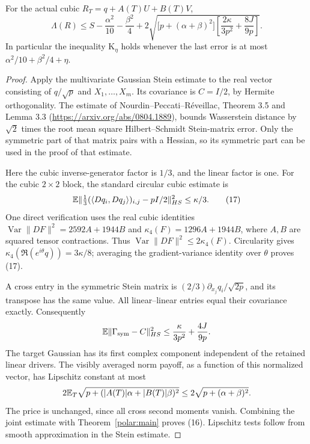 \begin{theorem}\label{polar:joint}
For the actual cubic $R_T=q+A(T)U+B(T)V$,
\[
 \Lambda(R)\le S-\frac{\alpha^2}{10}-\frac{\beta^2}{4}
 +2\sqrt{\bigl[p+(\alpha+\beta)^2\bigr]
             \left[\frac{2\kappa}{3p^2}+\frac{8J}{9p}\right]}.
                                                               \tag{16}
\]
In particular the inequality K$_\eta$ holds whenever the last error
is at most $\alpha^2/10+\beta^2/4+\eta$.
\end{theorem}
\begin{proof}
Apply the multivariate Gaussian Stein estimate to the real vector
consisting of $q/\sqrt p$ and $X_1,\ldots,X_m$. Its covariance is
$C=I/2$, by Hermite orthogonality. The estimate of
Nourdin--Peccati--R\'eveillac, Theorem 3.5 and Lemma 3.3
(\url{https://arxiv.org/abs/0804.1889}), bounds Wasserstein distance
by $\sqrt2$ times the root mean square Hilbert--Schmidt Stein-matrix
error. Only the symmetric part of that matrix pairs with a Hessian,
so its symmetric part can be used in the proof of that estimate.

Here the cubic inverse-generator factor is $1/3$, and the linear
factor is one. For the cubic $2\times2$ block, the standard circular
cubic estimate is
\[
 \mathbb E\|\tfrac13(\langle Dq_i,Dq_j\rangle)_{i,j}-pI/2\|_{HS}^2
 \le\kappa/3.                                             \tag{17}
\]
One direct verification uses the real cubic identities
$\operatorname{Var}\|DF\|^2=2592A+1944B$ and
$\kappa_4(F)=1296A+1944B$, where $A,B$ are squared tensor
contractions. Thus $\operatorname{Var}\|DF\|^2\le2\kappa_4(F)$.
Circularity gives $\kappa_4(\Re(e^{i\theta}q))=3\kappa/8$;
averaging the gradient-variance identity over $\theta$ proves (17).

A cross entry in the symmetric Stein matrix is
$(2/3)\partial_{x_j}q_i/\sqrt{2p}$, and its transpose has the same
value. All linear--linear entries equal their covariance exactly.
Consequently
\[
 \mathbb E\|\Gamma_{\rm sym}-C\|_{HS}^2
 \le\frac{\kappa}{3p^2}+\frac{4J}{9p}.
\]
The target Gaussian has its first complex component independent of
the retained linear drivers. The visibly averaged norm payoff, as a
function of this normalized vector, has Lipschitz constant at most
\[
 2\mathbb E_T\sqrt{p+(|A(T)|\alpha+|B(T)|\beta)^2}
 \le2\sqrt{p+(\alpha+\beta)^2}.
\]
The price is unchanged, since all cross second moments vanish.
Combining the joint estimate with Theorem~\ref{polar:main} proves (16).
Lipschitz tests follow from smooth approximation in the Stein estimate.
\end{proof}

